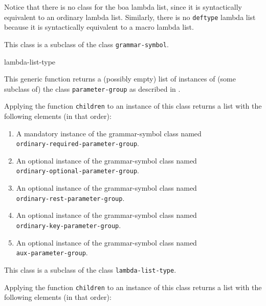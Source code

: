 Notice that there is no class for the boa lambda list, since it is
syntactically equivalent to an ordinary lambda list.  Similarly, there
is no \texttt{deftype} lambda list because it is syntactically
equivalent to a macro lambda list.


This class is a subclass of the class \texttt{grammar-symbol}.

 {lambda-list-type}

This generic function returns a (possibly empty) list of instances of
(some subclass of) the class \texttt{parameter-group} as described in
.


Applying the function \texttt{children} to an instance of this class
returns a list with the following elements (in that order):

\begin{enumerate}
\item A mandatory instance of the grammar-symbol class named\\
  \texttt{ordinary-required-parameter-group}.
\item An optional instance of the grammar-symbol class named\\
  \texttt{ordinary-optional-parameter-group}.
\item An optional instance of the grammar-symbol class named\\
\texttt{ordinary-rest-parameter-group}.
\item An optional instance of the grammar-symbol class named\\
\texttt{ordinary-key-parameter-group}.
\item An optional instance of the grammar-symbol class named\\
\texttt{aux-parameter-group}.
\end{enumerate}

This class is a subclass of the class \texttt{lambda-list-type}.


Applying the function \texttt{children} to an instance of this class
returns a list with the following elements (in that order):

